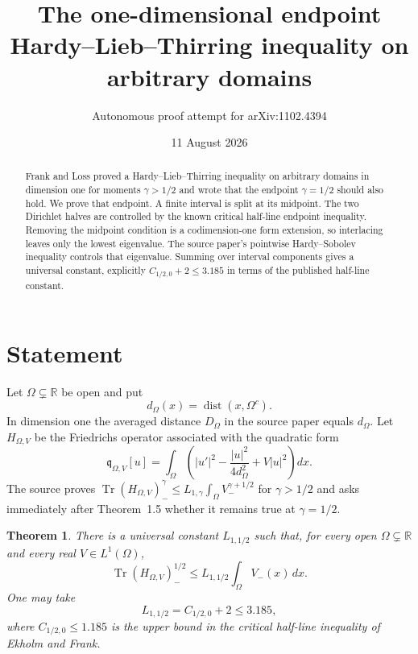 \documentclass[11pt]{article}
\title{The one-dimensional endpoint Hardy--Lieb--Thirring inequality on arbitrary domains}
\author{Autonomous proof attempt for arXiv:1102.4394}
\date{11 August 2026}
\newtheorem{theorem}{Theorem}
\newcommand{\R}{\mathbb R}
\newcommand{\Tr}{\operatorname{Tr}}
\newcommand{\dist}{\operatorname{dist}}
\begin{document}
\maketitle

\begin{abstract}
Frank and Loss proved a Hardy--Lieb--Thirring inequality on arbitrary domains
in dimension one for moments $\gamma>1/2$ and wrote that the endpoint
$\gamma=1/2$ should also hold.  We prove that endpoint.  A finite interval is
split at its midpoint.  The two Dirichlet halves are controlled by the known
critical half-line endpoint inequality.  Removing the midpoint condition is a
codimension-one form extension, so interlacing leaves only the lowest
eigenvalue.  The source paper's pointwise Hardy--Sobolev inequality controls
that eigenvalue.  Summing over interval components gives a universal constant,
explicitly $C_{1/2,0}+2\leq3.185$ in terms of the published half-line constant.
\end{abstract}

\section{Statement}

Let $\Omega\subsetneq\R$ be open and put
$$d_\Omega(x)=\dist(x,\Omega^c).$$
In dimension one the averaged distance $D_\Omega$ in the source paper equals
$d_\Omega$.  Let $H_{\Omega,V}$ be the Friedrichs operator associated with
the quadratic form
\begin{equation}\label{eq:form}
 \mathfrak q_{\Omega,V}[u]
 =\int_\Omega\left(|u'|^2-\frac{|u|^2}{4d_\Omega^2}
                         +V|u|^2\right)dx.
\end{equation}
The source proves
$\Tr(H_{\Omega,V})_-^\gamma\le L_{1,\gamma}
\int_\Omega V_-^{\gamma+1/2}$ for $\gamma>1/2$ and asks immediately
after Theorem~1.5 whether it remains true at $\gamma=1/2$.

\begin{theorem}\label{thm:main}
There is a universal constant $L_{1,1/2}$ such that, for every open
$\Omega\subsetneq\R$ and every real $V\in L^1(\Omega)$,
\begin{equation}\label{eq:main}
 \Tr(H_{\Omega,V})_-^{1/2}
 \le L_{1,1/2}\int_\Omega V_-(x)\,dx.
\end{equation}
One may take
$$L_{1,1/2}=C_{1/2,0}+2\leq3.185,$$
where $C_{1/2,0}\leq1.185$ is the upper bound in the critical half-line
inequality of Ekholm and Frank.
\end{theorem}
\end{document}
